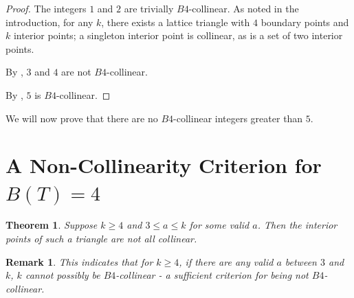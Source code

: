 \documentclass{article}
\theoremstyle{mydefstyle}
\newtheorem{theorem}{Theorem}
\newtheorem*{remark}{Remark}
\begin{document}
\begin{proof}
The integers $1$ and $2$ are trivially $B4$-collinear. As noted in the introduction, for any $k$, there exists a lattice triangle with $4$ boundary points and $k$ interior points; a singleton interior point is collinear, as is a set of two interior points. 

By , $3$ and $4$ are not $B4$-collinear. 

By , $5$ is $B4$-collinear. 
\end{proof}

We will now prove that there are no $B4$-collinear integers greater than $5$. 

\section{A Non-Collinearity Criterion for $B(T)=4$}

\begin{theorem}
\label{noncolcrit:label}
Suppose $k\ge4$ and $3\le a\le k$ for some valid $a$. Then the interior points of such a triangle are not all collinear. 
\end{theorem}

\begin{remark}This indicates that for $k\ge4$, if there are any valid $a$ between $3$ and $k$, $k$ cannot possibly be $B4$-collinear - a sufficient criterion for being not $B4$-collinear. \end{remark}
\end{document}
